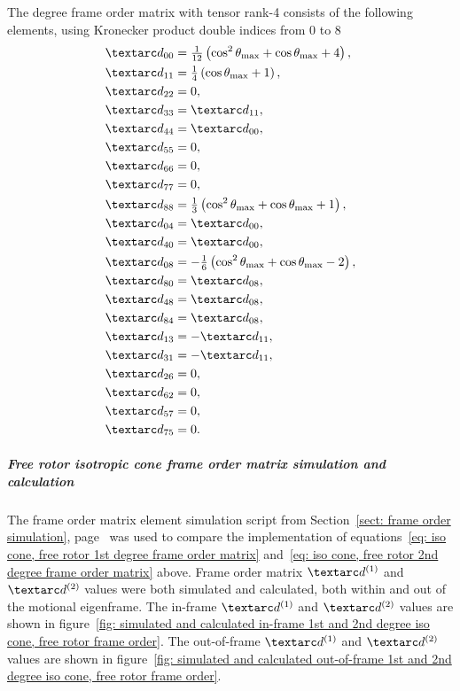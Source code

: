 The  degree frame order matrix with tensor rank-4 consists of the following elements, using Kronecker product double indices from 0 to 8
\begin{subequations} \label{eq: iso cone, free rotor 2nd degree frame order matrix}
\begin{align}
    &\FO_{00} = \tfrac{1}{12} \left( \cos^2\conethetamax + \cos\conethetamax + 4 \right) , \\
    &\FO_{11} = \tfrac{1}{4} \left( \cos\conethetamax + 1 \right) , \\
    &\FO_{22} = 0 , \\
    &\FO_{33} = \FO_{11} , \\
    &\FO_{44} = \FO_{00} , \\
    &\FO_{55} = 0 , \\
    &\FO_{66} = 0 , \\
    &\FO_{77} = 0 , \\
    &\FO_{88} = \tfrac{1}{3} \left( \cos^2\conethetamax + \cos\conethetamax + 1 \right) , \\
    &\FO_{04} = \FO_{00} , \\
    &\FO_{40} = \FO_{00} , \\
    &\FO_{08} = -\tfrac{1}{6} \left( \cos^2\conethetamax + \cos\conethetamax - 2 \right) , \\
    &\FO_{80} = \FO_{08} , \\
    &\FO_{48} = \FO_{08} , \\
    &\FO_{84} = \FO_{08} , \\
    &\FO_{13} = -\FO_{11} , \\
    &\FO_{31} = -\FO_{11} , \\
    &\FO_{26} = 0 , \\
    &\FO_{62} = 0 , \\
    &\FO_{57} = 0 , \\
    &\FO_{75} = 0 .
\end{align}
\end{subequations}


\subparagraph[Frame order matrix simulation and calculation]{Free rotor isotropic cone frame order matrix simulation and calculation}

The frame order matrix element simulation script from Section~\ref{sect: frame order simulation}, page~\pageref{sect: frame order simulation} was used to compare the implementation of equations~\ref{eq: iso cone, free rotor 1st degree frame order matrix} and~\ref{eq: iso cone, free rotor 2nd degree frame order matrix} above.
Frame order matrix $\FOone$ and $\FOtwo$ values were both simulated and calculated, both within and out of the motional eigenframe.
The in-frame $\FOone$ and $\FOtwo$ values are shown in figure~\ref{fig: simulated and calculated in-frame 1st and 2nd degree iso cone, free rotor frame order}.
The out-of-frame $\FOone$ and $\FOtwo$ values are shown in figure~\ref{fig: simulated and calculated out-of-frame 1st and 2nd degree iso cone, free rotor frame order}.




